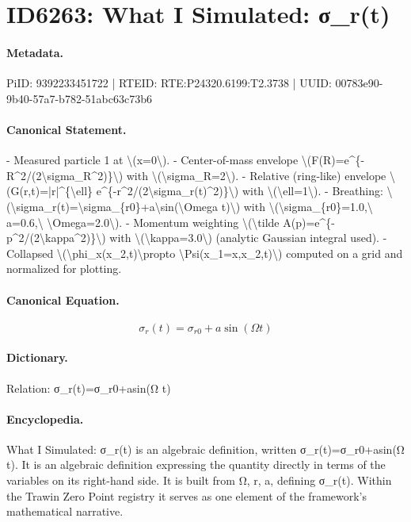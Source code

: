\section*{ID6263: What I Simulated: σ\_r(t)}
\paragraph{Metadata.}
PiID: 9392233451722 | RTEID: RTE:P24320.6199:T2.3738 | UUID: 00783e90-9b40-57a7-b782-51abc63c73b6

\paragraph{Canonical Statement.}
- Measured particle 1 at \textbackslash{}(x=0\textbackslash{}). - Center-of-mass envelope \textbackslash{}(F(R)=e\textasciicircum{}\{-R\textasciicircum{}2/(2\textbackslash{}sigma\_R\textasciicircum{}2)\}\textbackslash{}) with \textbackslash{}(\textbackslash{}sigma\_R=2\textbackslash{}). - Relative (ring-like) envelope \textbackslash{}(G(r,t)=|r|\textasciicircum{}\{\textbackslash{}ell\} e\textasciicircum{}\{-r\textasciicircum{}2/(2\textbackslash{}sigma\_r(t)\textasciicircum{}2)\}\textbackslash{}) with \textbackslash{}(\textbackslash{}ell=1\textbackslash{}). - Breathing: \textbackslash{}(\textbackslash{}sigma\_r(t)=\textbackslash{}sigma\_\{r0\}+a\textbackslash{}sin(\textbackslash{}Omega t)\textbackslash{}) with \textbackslash{}(\textbackslash{}sigma\_\{r0\}=1.0,\textbackslash{} a=0.6,\textbackslash{} \textbackslash{}Omega=2.0\textbackslash{}). - Momentum weighting \textbackslash{}(\textbackslash{}tilde A(p)=e\textasciicircum{}\{-p\textasciicircum{}2/(2\textbackslash{}kappa\textasciicircum{}2)\}\textbackslash{}) with \textbackslash{}(\textbackslash{}kappa=3.0\textbackslash{}) (analytic Gaussian integral used). - Collapsed \textbackslash{}(\textbackslash{}phi\_x(x\_2,t)\textbackslash{}propto \textbackslash{}Psi(x\_1=x,x\_2,t)\textbackslash{}) computed on a grid and normalized for plotting.

\paragraph{Canonical Equation.}
\[
\sigma_r(t)=\sigma_{r0}+a\sin(\Omega t)
\]

\paragraph{Dictionary.}
Relation: σ\_r(t)=σ\_r0+asin(Ω t)

\paragraph{Encyclopedia.}
What I Simulated: σ\_r(t) is an algebraic definition, written σ\_r(t)=σ\_r0+asin(Ω t). It is an algebraic definition expressing the quantity directly in terms of the variables on its right-hand side. It is built from Ω, r, a, defining σ\_r(t). Within the Trawin Zero Point registry it serves as one element of the framework's mathematical narrative.
